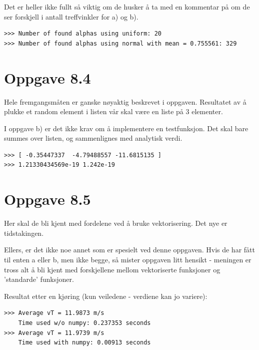 \documentclass[10pt,a4paper]{article}
\begin{document}
Det er heller ikke fullt så viktig om de husker å ta med en kommentar på om de ser forskjell i antall treffvinkler for a) og b). 

\begin{verbatim}
>>> Number of found alphas using uniform: 20
>>> Number of found alphas using normal with mean = 0.755561: 329
\end{verbatim}

\newpage
\section*{Oppgave 8.4}
Hele fremgangsmåten er ganske nøyaktig beskrevet i oppgaven. Resultatet av å plukke et random element i listen vår skal være en liste på 3 elementer.

I oppgave b) er det ikke krav om å implementere en testfunksjon. Det skal bare summes over listen, og sammenlignes med analytisk verdi.


\begin{verbatim}
>>> [ -0.35447337  -4.79488557 -11.6815135 ]
>>> 1.21330434569e-19 1.242e-19
\end{verbatim}


\pagebreak
\section*{Oppgave 8.5}
Her skal de bli kjent med fordelene ved å bruke vektorisering. Det nye er tidstakingen.

 Ellers, er det ikke noe annet som er spesielt ved denne oppgaven. Hvis de har fått til enten a eller b, men ikke begge, så mister oppgaven litt hensikt - meningen er tross alt å bli kjent med forskjellene mellom vektoriserte funksjoner og 'standarde' funksjoner. 

Resultat etter en kjøring (kun veiledene - verdiene kan jo variere):
\begin{verbatim}
>>> Average vT = 11.9873 m/s
    Time used w/o numpy: 0.237353 seconds
>>> Average vT = 11.9739 m/s
    Time used with numpy: 0.00913 seconds
\end{verbatim}
\end{document}
